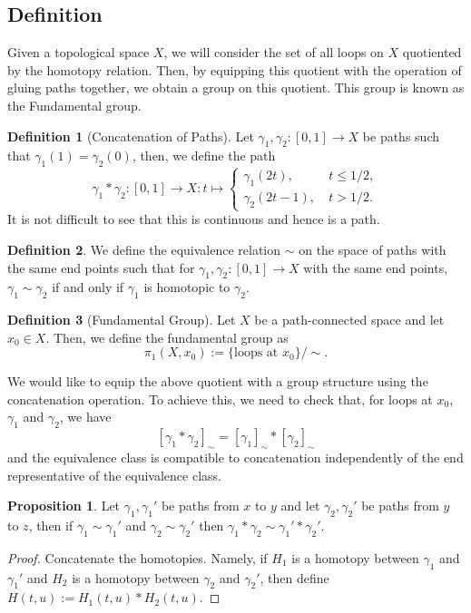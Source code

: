 \documentclass[]{article}
\theoremstyle{definition}
\theoremstyle{definition}
\newtheorem{definition}{Definition}[section]
\newtheorem{proposition}{Proposition}[section]
\begin{document}
\subsection{Definition}

Given a topological space \(X\), we will consider the set of all loops on 
\(X\) quotiented by the homotopy relation. Then, by equipping this quotient with 
the operation of gluing paths together, we obtain a group on this quotient. This 
group is known as the Fundamental group.

\begin{definition}[Concatenation of Paths]
  Let \(\gamma_1, \gamma_2 : [0, 1] \to X\) be paths such that \(\gamma_1(1) = \gamma_2(0)\), 
  then, we define the path 
  \[\gamma_1 * \gamma_2 : [0, 1] \to X : t \mapsto 
  \begin{cases}
    \gamma_1(2t), \ & t \le 1 / 2,\\
    \gamma_2(2t - 1), \ & t > 1 / 2. 
  \end{cases}\] 
  It is not difficult to see that this is continuous and hence is a path.
\end{definition}

\begin{definition}
  We define the equivalence relation \(\sim\) on the space of paths with the 
  same end points such that for \(\gamma_1, \gamma_2 : [0, 1] \to X\) with 
  the same end points, \(\gamma_1 \sim \gamma_2\) if and only if 
  \(\gamma_1\) is homotopic to \(\gamma_2\).
\end{definition}

\begin{definition}[Fundamental Group]
  Let \(X\) be a path-connected space and let \(x_0 \in X\). Then, we define 
  the fundamental group as 
  \[\pi_1(X, x_0) := \{\text{loops at \(x_0\)}\} / \sim.\]
\end{definition}

We would like to equip the above quotient with a group structure using the 
concatenation operation. To achieve this, we need to check that, for loops 
at \(x_0\), \(\gamma_1\) and \(\gamma_2\), we have 
\[[\gamma_1 * \gamma_2]_\sim = [\gamma_1]_\sim * [\gamma_2]_\sim\]
and the equivalence class is compatible to concatenation independently of the 
end representative of the equivalence class.

\begin{proposition}
  Let \(\gamma_1, \gamma_1'\) be paths from \(x\) to \(y\) and let \(\gamma_2, \gamma_2'\) 
  be paths from \(y\) to \(z\), then if \(\gamma_1 \sim \gamma_1'\) and 
  \(\gamma_2 \sim \gamma_2'\) then \(\gamma_1 * \gamma_2 \sim \gamma_1' * \gamma_2'\).
\end{proposition}
\begin{proof}
  Concatenate the homotopies. Namely, if \(H_1\) is a homotopy between \(\gamma_1\) 
  and \(\gamma_1'\) and \(H_2\) is a homotopy between \(\gamma_2\) and \(\gamma_2'\), 
  then define \(H(t, u) := H_1(t, u) * H_2(t, u)\). 
\end{proof}
\end{document}
